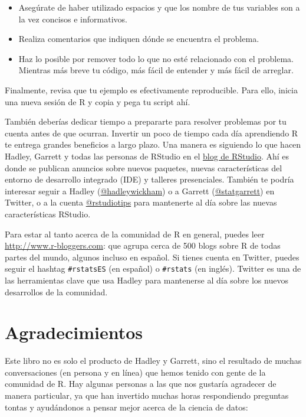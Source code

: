 \documentclass[11pt,oneside]{report}
\begin{document}
\begin{itemize}
\item
  Asegúrate de haber utilizado espacios y que los nombre de tus
  variables son a la vez concisos e informativos.
\item
  Realiza comentarios que indiquen dónde se encuentra el problema.
\item
  Haz lo posible por remover todo lo que no esté relacionado con el
  problema. Mientras más breve tu código, más fácil de entender y más
  fácil de arreglar.
\end{itemize}

Finalmente, revisa que tu ejemplo es efectivamente reproducible. Para
ello, inicia una nueva sesión de R y copia y pega tu script ahí.

También deberías dedicar tiempo a prepararte para resolver problemas por
tu cuenta antes de que ocurran. Invertir un poco de tiempo cada día
aprendiendo R te entrega grandes beneficios a largo plazo. Una manera es
siguiendo lo que hacen Hadley, Garrett y todas las personas de RStudio
en el \href{https://blog.rstudio.org}{blog de RStudio}. Ahí es donde se
publican anuncios sobre nuevos paquetes, nuevas características del
entorno de desarrollo integrado (IDE) y talleres presenciales. También
te podría interesar seguir a Hadley
(\href{https://twitter.com/hadleywickham}{@hadleywickham}) o a Garrett
(\href{https://twitter.com/statgarrett}{@statgarrett}) en Twitter, o a
la cuenta \href{https://twitter.com/rstudiotips}{@rstudiotips} para
mantenerte al día sobre las nuevas características RStudio.

Para estar al tanto acerca de la comunidad de R en general, puedes leer
\url{http://www.r-bloggers.com}: que agrupa cerca de 500 blogs sobre R
de todas partes del mundo, algunos incluso en español. Si tienes cuenta
en Twitter, puedes seguir el hashtag \texttt{\#rstatsES} (en español) o
\texttt{\#rstats} (en inglés). Twitter es una de las herramientas clave
que usa Hadley para mantenerse al día sobre los nuevos desarrollos de la
comunidad.

\hypertarget{agradecimientos}{%
\section{Agradecimientos}\label{agradecimientos}}

Este libro no es solo el producto de Hadley y Garrett, sino el resultado
de muchas conversaciones (en persona y en línea) que hemos tenido con
gente de la comunidad de R. Hay algunas personas a las que nos gustaría
agradecer de manera particular, ya que han invertido muchas horas
respondiendo preguntas tontas y ayudándonos a pensar mejor acerca de la
ciencia de datos:
\end{document}
